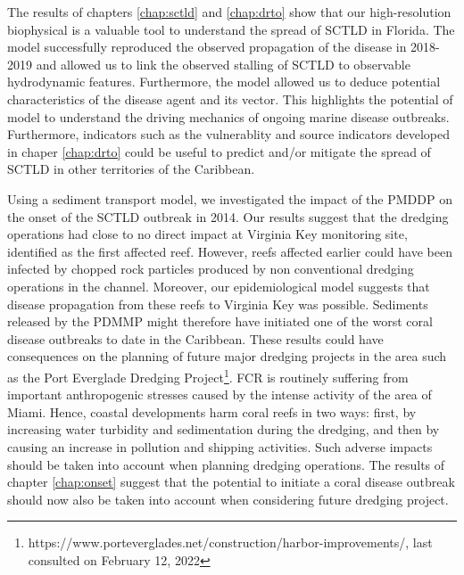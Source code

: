 The results of chapters \ref{chap:sctld} and \ref{chap:drto} show that our high-resolution biophysical is a valuable tool to understand the spread of SCTLD in Florida. The model successfully reproduced the observed propagation of the disease in 2018-2019 and allowed us to link the observed stalling of SCTLD to observable hydrodynamic features. Furthermore, the model allowed us to deduce potential characteristics of the disease agent and its vector. This highlights the potential of  model to understand the driving mechanics of ongoing marine disease outbreaks. Furthermore, indicators such as the vulnerablity and source indicators developed in chaper \ref{chap:drto} could be useful to predict and/or mitigate the spread of SCTLD in other territories of the Caribbean.

Using a sediment transport model, we investigated the impact of the PMDDP on the onset of the SCTLD outbreak in 2014. Our results suggest that the dredging operations had close to no direct impact at Virginia Key monitoring site, identified as the first affected reef. However, reefs affected earlier could have been infected by chopped rock particles produced by non conventional dredging operations in the channel. Moreover, our epidemiological model suggests that disease propagation from these reefs to Virginia Key was possible. Sediments released by the PDMMP might therefore have initiated one of the worst coral disease outbreaks to date in the Caribbean. These results could have consequences on the planning of future major dredging projects in the area such as the Port Everglade Dredging Project\footnote{https://www.porteverglades.net/construction/harbor-improvements/, last consulted on February 12, 2022}. FCR is routinely suffering from important anthropogenic stresses caused by the intense activity of the area of Miami. Hence, coastal developments harm coral reefs in two ways: first, by increasing water turbidity and sedimentation during the dredging, and then by causing an increase in pollution and shipping activities. Such adverse impacts should be taken into account when planning dredging operations. The results of chapter \ref{chap:onset} suggest that the potential to initiate a coral disease outbreak should now also be taken into account when considering future dredging project.

